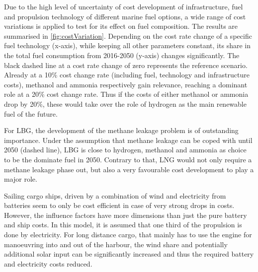 \documentclass[article]{elsarticle}
\begin{document}
Due to the high level of uncertainty of cost development of infrastructure, fuel and propulsion technology of different marine fuel options, a wide range of cost variations is applied to test for its effect on fuel composition. The results are summarised in \autoref{fig:costVariation}. Depending on the cost rate change of a specific fuel technology (x-axis), while keeping all other parameters constant, its share in the total fuel consumption from 2016-2050 (y-axis) changes significantly. The black dashed line at a cost rate change of zero represents the reference scenario. Already at a 10\% cost change rate (including fuel, technology and infrastructure costs), methanol and ammonia respectively gain relevance, reaching a dominant role at a 20\% cost change rate. Thus if the costs of either methanol or ammonia drop by 20\%, these would take over the role of hydrogen as the main renewable fuel of the future.

For LBG, the development of the methane leakage problem is of outstanding importance. Under the assumption that methane leakage can be coped with until 2050 (dashed line), LBG is close to hydrogen, methanol and ammonia as choice to be the dominate fuel in 2050. Contrary to that, LNG would not only require a methane leakage phase out, but also a very favourable cost development to play a major role.

Sailing cargo ships, driven by a combination of wind and electricity from batteries seem to only be cost efficient in case of very strong drops in costs. However, the influence factors have more dimensions than just the pure battery and ship costs. In this model, it is assumed that one third of the propulsion is done by electricity. For long distance cargo, that mainly has to use the engine for manoeuvring into and out of the harbour, the wind share and potentially additional solar input can be significantly increased and thus the required battery and electricity costs reduced.
\end{document}

